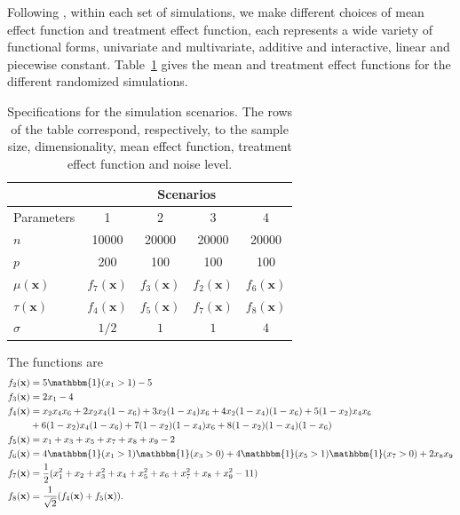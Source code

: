 \documentclass{article}
\def\x{\mathbf x}
\begin{document}
Following \cite{powers2018some},  within each set of simulations, we make different choices of mean effect function and treatment effect function, each represents a wide variety of functional forms, univariate and multivariate, additive and interactive, linear and  piecewise constant. Table~\ref{tab:scenarios} gives the mean and treatment effect functions for the different randomized simulations.
\begin{table}[!ht]
    \centering
    \begin{tabular}{l|cccc}
    \hline
        & \multicolumn{4}{c}{Scenarios} \\
        \hline
        Parameters & 1 & 2 & 3 & 4 \\
        \hline
        $n$ & 10000 & 20000 & 20000 & 20000 \\
        $p$ & 200 & 100 & 100 & 100 \\
        $\mu(\x)$ & $f_7(\x)$ & $f_3(\x)$ & $f_2(\x)$ & $f_6(\x)$\\
        $\tau(\x)$ & $f_4(\x)$ & $f_5(\x)$ &$ f_7(\x)$ & $f_8(\x)$\\
        $\sigma$ & $1/2$ & $1$ & $1$ & $4$\\
        \hline
    \end{tabular}
    \vspace{2mm}
    \caption{Specifications for the simulation scenarios. The rows of the table correspond, respectively, to the sample size, dimensionality, mean effect function, treatment effect function and noise level.}
    \label{tab:scenarios}
\end{table}

The functions are
\begin{align*}
    f_2(\x) &= 5 \mathbbm{1}(x_1 > 1) - 5\\
    f_3(\x) &= 2 x_1 - 4 \\
    f_4(\x) &= x_2 x_4 x_6 + 2 x_2 x_4 (1-x_6) +3x_2(1-x_4)x_6 + 4x_2(1-x_4)(1-x_6) + 5(1-x_2)x_4x_6 \\
            &+ 6(1-x_2)x_4(1-x_6) + 7 (1-x_2)(1-x_4)x_6 + 8(1-x_2)(1-x_4)(1-x_6)\\
    f_5(\x) &= x_1 + x_3 + x_5 + x_7 + x_8 + x_9 - 2\\
    f_6(\x) &= 4 \mathbbm{1}(x_1 > 1)\mathbbm{1}(x_3 > 0) + 4\mathbbm{1}(x_5 > 1)\mathbbm{1}(x_7 > 0) + 2x_8x_9\\
    f_7(\x) &= \frac{1}{2} (x_1^2 + x_2 + x_3^2 + x_4 + x_5^2 + x_6 + x_7^2 + x_8 + x_9^2 - 11)\\
    f_8(\x) &= \frac{1}{\sqrt{2}} (f_4(\x) + f_5(\x)).
\end{align*}
\end{document}
